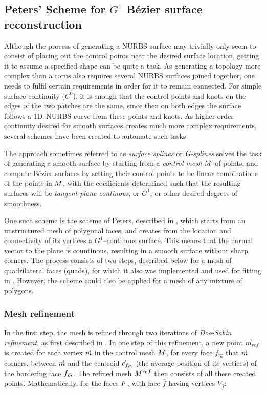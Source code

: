 \subsection{Peters' Scheme for $G^1$ B{\'e}zier surface reconstruction}
\label{subsec:peters}
Although the process of generating a NURBS surface may trivially only seem to consist of placing out the control points near the desired surface location, getting it to assume a specified shape can be quite a task. As generating a topology more complex than a torus  also requires several NURBS surfaces joined together, one needs to fulfil certain requirements in order for it to remain connected. For simple surface continuity ($C^0$), it is enough that the control points and knots on the edges of the two patches are the same, since then on both edges the surface follows a 1D--NURBS-curve from these points and knots. As higher-order continuity desired for smooth surfaces creates much more complex requirements, several schemes have been created to automate such tasks.

The approach sometimes referred to as \emph{surface splines} or \emph{G-splines} \cite{eck1996automatic} solves the task of generating a smooth surface by starting from a \emph{control mesh} $\petersControlMesh$ of points, and compute B{\'e}zier surfaces by setting their control points to be linear combinations of the points in $\petersControlMesh$, with the coefficients determined such that the resulting surfaces will be \emph{tangent plane continous}, or $G^1$, or other desired degrees of smoothness. 

One such scheme is the scheme of Peters, described in \cite{peters1992constructing}, which starts from an unstructured mesh of polygonal faces, and creates from the location and connectivity of its vertices a $G^1$--continous surface. This means that the normal vector to the plane is countinous, resulting in a smooth surface without sharp corners. The process consists of two steps, described below for a mesh of quadrilateral faces (quads), for which it also was implemented and used for fitting in \cite{eck1996automatic}. However, the scheme could also be applied for a mesh of any mixture of polygons.

\subsubsection{Mesh refinement}
In the first step, the mesh is refined through two iterations of \emph{Doo-Sabin refinement}, as first described in \cite{DooSabin1978subdiv}. In one step of this refinement, a new point $\vec{m}_{ref}$  is created for each vertex $\petersControlMeshVec$ in the control mesh $\petersControlMesh$, for every face $f_{\vec{m}}$ that $\petersControlMeshVec$ corners,  between $\petersControlMeshVec$ and the centroid $\centroidof{f_{\petersControlMeshVec}}$ (the average position of its vertices) of the bordering face $f_{\petersControlMeshVec}$. The refined mesh $\petersControlMesh^{ref}$ then consists of all these created points. Mathematically, for the faces $\petersFaces$, with face ${\hat{f}}$ having vertices $V_{\hat{f}}$:

